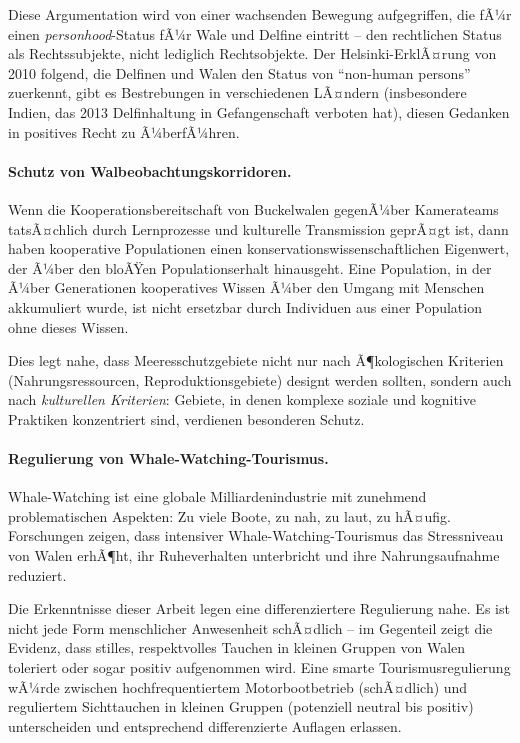﻿\documentclass[12pt,a4paper]{article}
\theoremstyle{definition}
\theoremstyle{remark}
\begin{document}
Diese Argumentation wird von einer wachsenden Bewegung aufgegriffen, die fÃ¼r einen \emph{personhood}-Status fÃ¼r Wale und Delfine eintritt -- den rechtlichen Status als Rechtssubjekte, nicht lediglich Rechtsobjekte. Der Helsinki-ErklÃ¤rung von 2010 folgend, die Delfinen und Walen den Status von ``non-human persons'' zuerkennt, gibt es Bestrebungen in verschiedenen LÃ¤ndern (insbesondere Indien, das 2013 Delfinhaltung in Gefangenschaft verboten hat), diesen Gedanken in positives Recht zu Ã¼berfÃ¼hren.

\paragraph{Schutz von Walbeobachtungskorridoren.}
Wenn die Kooperationsbereitschaft von Buckelwalen gegenÃ¼ber Kamerateams tatsÃ¤chlich durch Lernprozesse und kulturelle Transmission geprÃ¤gt ist, dann haben kooperative Populationen einen konservationswissenschaftlichen Eigenwert, der Ã¼ber den bloÃŸen Populationserhalt hinausgeht. Eine Population, in der Ã¼ber Generationen kooperatives Wissen Ã¼ber den Umgang mit Menschen akkumuliert wurde, ist nicht ersetzbar durch Individuen aus einer Population ohne dieses Wissen.

Dies legt nahe, dass Meeresschutzgebiete nicht nur nach Ã¶kologischen Kriterien (Nahrungsressourcen, Reproduktionsgebiete) designt werden sollten, sondern auch nach \emph{kulturellen Kriterien}: Gebiete, in denen komplexe soziale und kognitive Praktiken konzentriert sind, verdienen besonderen Schutz.

\paragraph{Regulierung von Whale-Watching-Tourismus.}
Whale-Watching ist eine globale Milliardenindustrie mit zunehmend problematischen Aspekten: Zu viele Boote, zu nah, zu laut, zu hÃ¤ufig. Forschungen zeigen, dass intensiver Whale-Watching-Tourismus das Stressniveau von Walen erhÃ¶ht, ihr Ruheverhalten unterbricht und ihre Nahrungsaufnahme reduziert.

Die Erkenntnisse dieser Arbeit legen eine differenziertere Regulierung nahe. Es ist nicht jede Form menschlicher Anwesenheit schÃ¤dlich -- im Gegenteil zeigt die Evidenz, dass stilles, respektvolles Tauchen in kleinen Gruppen von Walen toleriert oder sogar positiv aufgenommen wird. Eine smarte Tourismusregulierung wÃ¼rde zwischen hochfrequentiertem Motorbootbetrieb (schÃ¤dlich) und reguliertem Sichttauchen in kleinen Gruppen (potenziell neutral bis positiv) unterscheiden und entsprechend differenzierte Auflagen erlassen.
\end{document}
